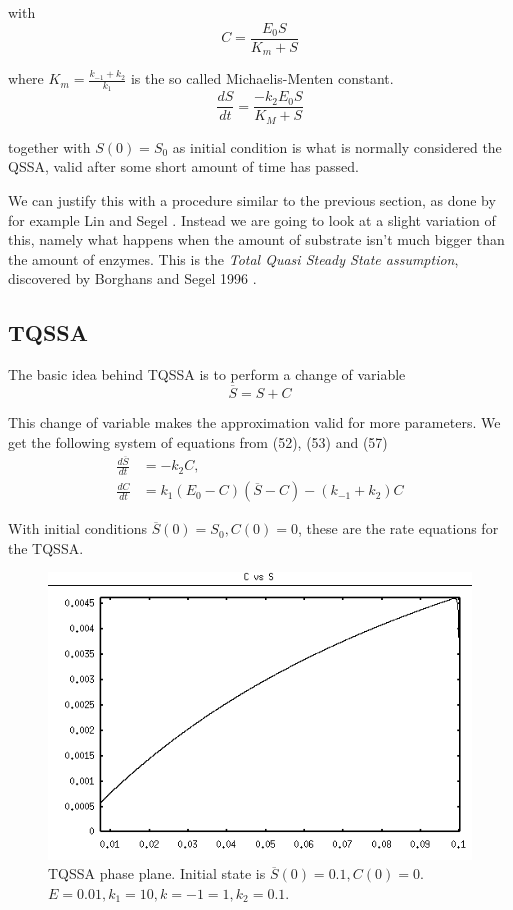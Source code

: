 \documentclass[12pt]{article}
\begin{document}
with
\begin{equation}
C = \frac{E_0 S}{K_m +S}
\end{equation}

where $K_m = \frac{k_{-1} + k_2}{k_1}$ is the so called {Michaelis-Menten
constant}.
\begin{equation}
\frac{dS}{dt} = \frac{-k_2 E_0 S}{K_M + S}
\end{equation}

together with $S(0) = S_0$ as initial condition is what is normally considered
the QSSA, valid after some short amount of time has passed.

We can justify this with a procedure similar to the previous section, as done by
for example Lin and Segel \cite{lin1974mathematics}. Instead we are going to
look at a slight variation of this, namely what happens when the amount of
substrate isn't much bigger than the amount of enzymes. This is the
\textit{Total Quasi Steady State assumption}, discovered by Borghans and Segel
1996 \cite{borghans1996extending}.

\subsection{TQSSA}

The basic idea behind TQSSA is to perform a change of variable
\begin{equation}
\overline{S} = S + C
\end{equation}

This change of variable makes the approximation valid for more parameters. We
get the following system of equations from (52), (53) and (57)
\begin{align}
\frac{d\overline{S}}{dt} &= - k_2 C, \\
\frac{dC}{dt} &= k_1(E_0-C)(\overline{S}-C)-(k_{-1}+ k_2) C
\end{align}

With initial conditions $\overline{S}(0)=S_0, C(0)=0$, these are the rate
equations for the TQSSA.
\begin{figure}[ht!]
\centering
\includegraphics[width=120mm]
{tqssa-phase-plane-b.png}
\caption{TQSSA phase plane. Initial state is $\overline{S}(0)=0.1,
  C(0)=0$. $E=0.01, k_1=10, k={-1}=1, k_2=0.1$.}
\label{overflow}
\end{figure}
\end{document}
